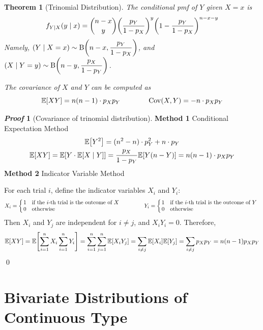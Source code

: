 \documentclass[10pt,UTF8]{article}
\makeatletter
\newenvironment{definition box}
{\begin{tcolorbox}[colback=blue!5!white,colframe=blue!75!black,parbox=false,before upper=\par,before lower=\par]}
{\end{tcolorbox}}
\newenvironment{theorem box}
{\begin{tcolorbox}[colback=yellow!5!white,colframe=yellow!75!black,parbox=false,before upper=\par,before lower=\par]}
{\end{tcolorbox}}
\theoremstyle{definition}
\newtheorem{definition inner}{Definition}[section]
\theoremstyle{plain}
\newtheorem{theorem inner}{Theorem}[section]
\newenvironment{theorem}[1][]
{\begin{theorem box}\begin{theorem inner}[#1]\hfill\par}
{\end{theorem inner}\end{theorem box}}
\theoremstyle{definition}
\newtheorem*{proof inner}{\textit{Proof}}
\renewenvironment{proof}[1][]
{\begin{proof inner}[#1]\hfill\par}
{\qed\end{proof inner}}
\theoremstyle{remark}
\newcommand{\mycases}[2][0.8]{
    \left\{\vphantom{\scalebox{#1}{
        $\begin{matrix}#2\end{matrix}$
    }}\right.\!\!\!\!
    \begin{array}{l@{\quad}l}#2\end{array}
}
\newcommand{\E}[1]{\mathbb{E}\qty[#1]}  %
\newcommand{\Cov}{\mathrm{Cov}\qty}  %
\makeatother
\begin{document}
\begin{theorem}[Trinomial Distribution]
    The conditional pmf of $Y$ given $X=x$ is
    \begin{equation*}
        f_{Y|X}(y\mid x) =
        \binom{n-x}{y} \qty(\frac{p_Y}{1-p_X})^y \qty(1-\frac{p_Y}{1-p_X})^{n-x-y}
    \end{equation*}
    Namely, $(Y\mid X=x)\sim\mathrm{B}\qty(n-x,\dfrac{p_Y}{1-p_X})$,
    and $(X\mid Y=y)\sim\mathrm{B}\qty(n-y,\dfrac{p_X}{1-p_Y})$.

    The covariance of $X$ and $Y$ can be computed as
    \begin{equation*}
        \E{X Y} = n(n-1)\cdot p_X p_Y \qquad\qquad
        \Cov(X,Y) = -n \cdot p_X p_Y
    \end{equation*}
\end{theorem}
\begin{proof}[Covariance of trinomial distribution]
    \noindent\textbf{Method 1} \quad Conditional Expectation Method
    \begin{gather*}
        \E{Y^2} = (n^2-n)\cdot p_Y^2 + n\cdot p_Y \\
        \E{X Y} = \E{Y\cdot\E{X\mid Y}}
        = \frac{p_X}{1-p_Y}\E{Y(n-Y)}
        = n(n-1)\cdot p_X p_Y
    \end{gather*}
    \noindent\textbf{Method 2} \quad Indicator Variable Method
    \par
    For each trial $i$, define the indicator variables $X_i$ and $Y_i$:
    \begin{equation*}
        X_i = \mycases{
            1 & \text{if the $i$-th trial is the outcome of $X$} \\
            0 & \text{otherwise}
        } \qquad\qquad
        Y_i = \mycases{
            1 & \text{if the $i$-th trial is the outcome of $Y$} \\
            0 & \text{otherwise}
        }
    \end{equation*}
    Then $X_i$ and $Y_j$ are independent for $i\neq j$,
    and $X_i Y_i=0$. Therefore,
    \begin{align*}
        \E{X Y} = \E{\sum_{i=1}^n X_i \sum_{i=1}^n Y_i}
        = \sum_{i=1}^n \sum_{j=1}^n \E{X_i Y_j}
        = \sum_{i\neq j}\E{X_i}\E{Y_j}
        = \sum_{i\neq j} p_X p_Y
        = n(n-1) p_X p_Y
    \end{align*}
\end{proof}


\section{Bivariate Distributions of Continuous Type}
\end{document}
